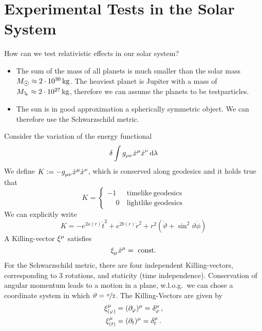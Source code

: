 \chapter{Experimental Tests in the Solar System}
How can we test relativistic effects in our solar system?
\begin{itemize}
  \item The sum of the mass of all planets is much smaller than the solar mass
  $M_{\astrosun}\approx \unit[2\cdot 10^{30}]{kg}$. The heaviest planet is
  Jupiter with a mass of $M_{\jupiter}\approx \unit[2\cdot 10^{27}]{kg}$,
  therefore we can assume the planets to be testparticles.
  \item The sun is in good approximation a spherically symmetric object. We can
  therefore use the Schwarzschild metric.
\end{itemize}
Consider the variation of the energy functional 
\begin{equation}
\delta
\int\tensor{g}{_\mu_\nu}\tensor{\dot{x}}{^\mu}\tensor{\dot{x}}{^\nu}\dif\lambda
\end{equation}
We define
$K:=-\tensor{g}{_\mu_\nu}\tensor{\dot{x}}{^\mu}\tensor{\dot{x}}{^\nu}$, which is
conserved along geodesics and it holds true that
\begin{equation}
K=\begin{cases}
-1& \mathrm{\ timelike\ geodesics}\\
\phantom{-}0& \mathrm{\ lightlike\ geodesics}
\end{cases}
\end{equation}
We can explicitly write
\begin{equation}
K=-e^{2a(r)}\dot{t}^2+e^{2b(r)}\dot{r}^2+r^2\left(\dot{\vartheta}+\sin^2\vartheta
\dot{\phi}\right)
\end{equation}
A Killing-vector $\tensor{\xi}{^\mu}$ satisfies
\begin{equation}
\tensor{\xi}{_\mu}\tensor{\dot{x}}{^\mu}=\mathrm{\ const.}
\end{equation}
For the Schwarzschild metric, there are four independent Killing-vectors,
corresponding to 3 rotations, and staticity (time independence).
Conservation of angular momentum leads to a motion in a plane, w.l.o.g.\ we can
chose a coordinate system in which $\vartheta=\nicefrac{\pi}{2}$.
The Killing-Vectors are given by
\begin{align}
\tensor*{\xi}{_{(\varphi)}^\mu}&=(\partial_\varphi)^\mu=\tensor*{\delta}{_\varphi^\mu}\,,\\
\tensor*{\xi}{_{(t)}^\mu}&=(\partial_t)^\mu=\tensor*{\delta}{_t^\mu}\,.\\
\end{align}
